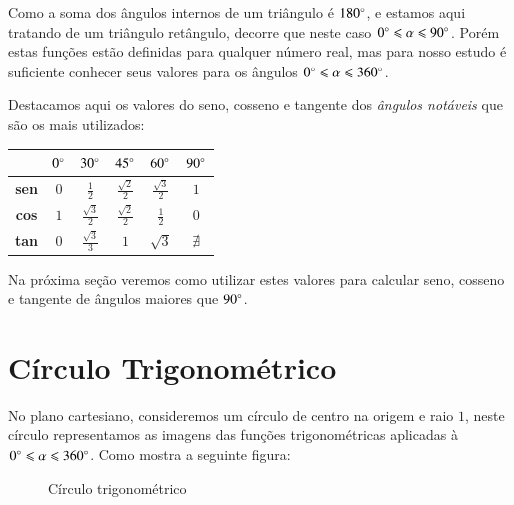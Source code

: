  \vskip0.3cm
 
 Como a soma dos ângulos internos de um triângulo é $180 \degree$, e estamos aqui tratando de um triângulo retângulo, decorre que neste caso $0 \degree \leqslant \alpha \leqslant 90 \degree$. Porém estas funções estão definidas para qualquer número real, mas para nosso estudo é suficiente conhecer seus valores para os ângulos $0 \degree \leqslant \alpha \leqslant 360 \degree$. 
 
 Destacamos aqui os valores do seno, cosseno e tangente dos \emph{ângulos notáveis} que são os mais utilizados:
 
 \begin{table}[H]
 \centering
 \begin{tabular}{|c|c|c|c|c|c|} \hline
 \rowcolor{cinza}
               & $0 \degree$  & $30 \degree$  & $45 \degree$  & $60 \degree$ & $90 \degree$  \\\hline
  \textbf{sen} & $0$ &$\frac{1}{2}$ & $\frac{\sqrt{2}}{2}$ & $\frac{\sqrt{3}}{2}$ & $1$ \\\hline
  \textbf{cos} & $1$ & $\frac{\sqrt{3}}{2}$ & $\frac{\sqrt{2}}{2}$ & $\frac{1}{2}$ & $0$ \\\hline
  \textbf{tan} & $0$ & $\frac{\sqrt{3}}{3}$ & $1$ & $\sqrt{3}$ & $\nexists$ \\\hline
 \end{tabular}
\end{table}
 Na próxima seção veremos como utilizar estes valores para calcular seno, cosseno e tangente de ângulos maiores que $90 \degree$.

\section{Círculo Trigonométrico}

 No plano cartesiano, consideremos um círculo de centro na origem e raio $1$, neste círculo representamos as imagens das funções trigonométricas aplicadas à  $0 \degree \leqslant \alpha \leqslant 360 \degree$. Como mostra a seguinte figura:
 \begin{figure}[H]
   \centering
   \caption{Círculo trigonométrico}
  \end{figure}
  
